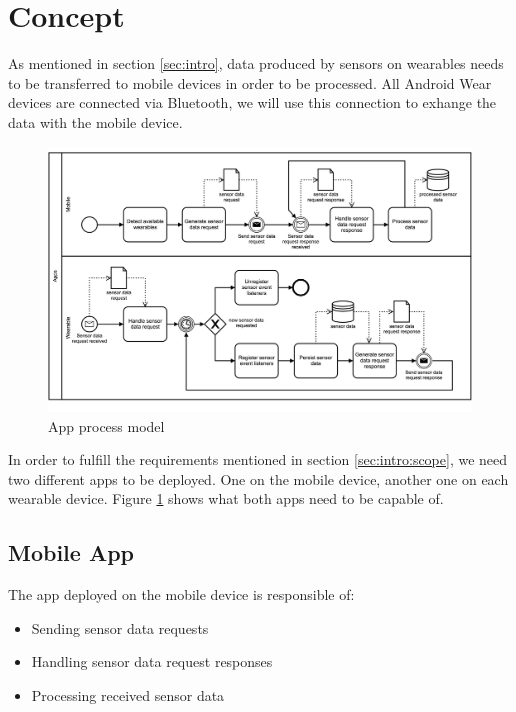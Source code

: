\section{Concept}
\label{sec:concept}

As mentioned in section \ref{sec:intro}, data produced by sensors on wearables needs to be transferred to mobile devices in order to be processed.
All Android Wear devices are connected via Bluetooth, we will use this connection to exhange the data with the mobile device.

\begin{figure}[H]
	\includegraphics[width=\linewidth]{diagrams/apps.png}
	\caption[Caption for bpmn]{App process model}
	\label{fig:diagrams:apps}
\end{figure}

In order to fulfill the requirements mentioned in section \ref{sec:intro:scope}, we need two different apps to be deployed.
One on the mobile device, another one on each wearable device.
Figure \ref{fig:diagrams:apps} shows what both apps need to be capable of.

\clearpage

\subsection{Mobile App}
\label{sec:concept:mobileapp}
The app deployed on the mobile device is responsible of:
\begin{itemize}[noitemsep]
	\item Sending sensor data requests
	\item Handling sensor data request responses
	\item Processing received sensor data
\end{itemize}

